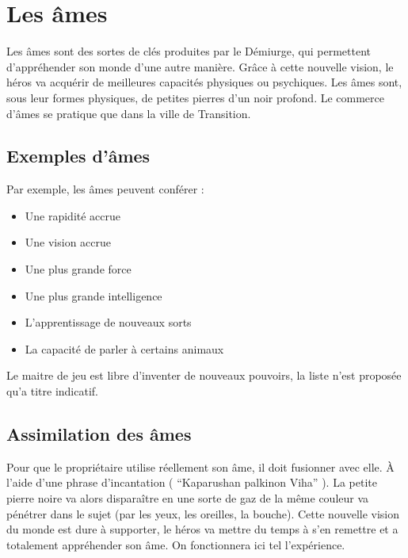 
\section{Les âmes}
Les âmes sont des sortes de clés produites par le Démiurge, qui permettent d'appréhender son monde d'une autre manière. Grâce à cette nouvelle vision, le héros va acquérir de meilleures capacités physiques ou psychiques. Les âmes sont, sous leur formes physiques, de petites pierres d'un noir profond. Le commerce d'âmes se pratique que dans la ville de Transition.
\subsection{Exemples d’âmes}
Par exemple, les âmes peuvent conférer :
\begin{itemize}
\item Une rapidité accrue
\item Une vision accrue
\item Une plus grande force
\item Une plus grande intelligence
\item L'apprentissage de nouveaux sorts
\item La capacité de parler à certains animaux
\end{itemize}
Le maitre de jeu est libre d'inventer de nouveaux pouvoirs, la liste n'est proposée qu'a titre indicatif.
\subsection{Assimilation des âmes}
Pour que le propriétaire utilise réellement son âme, il doit fusionner avec elle. À l'aide d'une phrase d'incantation ( “Kaparushan palkinon Viha” ). La petite pierre noire va alors disparaître en une sorte de gaz de la même couleur va pénétrer dans le sujet (par les yeux, les oreilles, la bouche). Cette nouvelle vision du monde est dure à supporter, le héros va mettre du temps à s'en remettre et a totalement appréhender son âme. On fonctionnera ici tel l’expérience.
